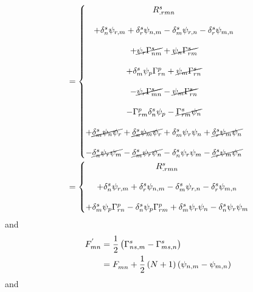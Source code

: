 \begin{align*}
&=\left\{\begin{matrix}
R^{s}_{.rmn}\\\\
+\delta^s_n\psi_{r,m} +\delta^s_r\psi_{n,m}-\delta^s_m\psi_{r,n} -\delta^s_r\psi_{m,n}\\\\
+\cancel{\psi_r\Gamma^{s}_{nm}} +\cancel{\psi_n \Gamma^{s}_{rm}}\\\\
+\delta^s_m\psi_p\Gamma^{p}_{rn} +\cancel{\psi_m\Gamma^{s}_{rn}}\\\\
-\cancel{\psi_r\Gamma^{s}_{mn}} -\cancel{\psi_m\Gamma^{s}_{rn}}\\\\
-\Gamma^{p}_{rm}\delta^s_n\psi_p -\cancel{\Gamma^{s}_{rm}\psi_n}\\\\
+\cancel{\delta^s_m\psi_n\psi_r} +\cancel{\delta^s_n\psi_m\psi_r }+\delta^s_m\psi_r\psi_n  +\cancel{\delta^s_r\psi_m\psi_n} \\\\
-\cancel{\delta^s_n\psi_r \psi_m }-\cancel{\delta^s_m\psi_r \psi_n}-\delta^s_n\psi_r\psi_m -\cancel{\delta^s_r\psi_m\psi_n}\\
\end{matrix}\right.\\
&=\left\{\begin{matrix}
R^{s}_{.rmn}\\\\
+\delta^s_n\psi_{r,m} +\delta^s_r\psi_{n,m}-\delta^s_m\psi_{r,n} -\delta^s_r\psi_{m,n}\\\\
+\delta^s_m\psi_p\Gamma^{p}_{rn} 
-\delta^s_n\psi_p \Gamma^{p}_{rm}
+\delta^s_m\psi_r\psi_n  -\delta^s_n\psi_r\psi_m 
\end{matrix}\right.
\end{align*}
and
\begin{align*}
F^{'}_{mn} &= \frac{1}{2}\left(\Gamma^{s}_{ns,m} - \Gamma^{s}_{ms,n}\right)\\
&=F^{}_{mn} + \frac{1}{2}\left(N+1\right)\left(\psi_{n,m} -\psi_{m,n}\right)
\end{align*}
and
